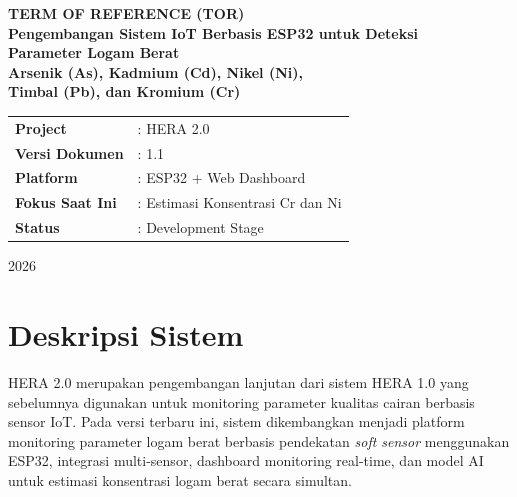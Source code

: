 \documentclass[12pt,a4paper]{article}
\begin{document}

\begin{titlepage}
    \centering
    \vspace*{2cm}

    {\Large \textbf{TERM OF REFERENCE (TOR)}}\\[0.5cm]

    {\LARGE \textbf{Pengembangan Sistem IoT Berbasis ESP32 untuk Deteksi}}\\[0.3cm]
    {\LARGE \textbf{Parameter Logam Berat}}\\[0.3cm]
    {\Large \textbf{Arsenik (As), Kadmium (Cd), Nikel (Ni),}}\\[0.2cm]
    {\Large \textbf{Timbal (Pb), dan Kromium (Cr)}}\\[1.5cm]

    \vfill

    \begin{tabular}{ll}
        \textbf{Project}         & : HERA 2.0 \\
        \textbf{Versi Dokumen}   & : 1.1 \\
        \textbf{Platform}        & : ESP32 + Web Dashboard \\
        \textbf{Fokus Saat Ini}  & : Estimasi Konsentrasi Cr dan Ni \\
        \textbf{Status}          & : Development Stage \\
    \end{tabular}

    \vfill

    {\large 2026}

\end{titlepage}

\tableofcontents
\newpage


\section{Deskripsi Sistem}

HERA 2.0 merupakan pengembangan lanjutan dari sistem HERA 1.0 yang sebelumnya digunakan untuk monitoring parameter kualitas cairan berbasis sensor IoT. Pada versi terbaru ini, sistem dikembangkan menjadi platform monitoring parameter logam berat berbasis pendekatan \textit{soft sensor} menggunakan ESP32, integrasi multi-sensor, dashboard monitoring real-time, dan model AI untuk estimasi konsentrasi logam berat secara simultan.
\end{document}
